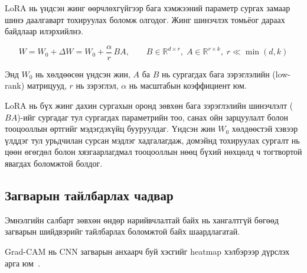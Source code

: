 LoRA нь үндсэн жинг өөрчлөхгүйгээр бага хэмжээний параметр сургах замаар шинэ даалгаварт тохируулах боломж олгодог. Жинг шинэчлэх томьёог дараах байдлаар илэрхийлнэ.

\begin{equation}
    W = W_0 + \Delta W = W_0 + \frac{\alpha}{r}\, B A,
    \qquad B \in \mathbb{R}^{d \times r},\; A \in \mathbb{R}^{r \times k},\; r \ll \min(d, k)
    \label{eq:lora}
\end{equation}

Энд $W_0$ нь хөлдөөсөн үндсэн жин, $A$ ба $B$ нь сургагдах бага зэрэглэлийн (low-rank) матрицууд, $r$ нь зэрэглэл, $\alpha$ нь масштабын коэффициент юм.

LoRA нь бүх жинг дахин сургахын оронд зөвхөн бага зэрэглэлийн шинэчлэлт ($BA$)-ийг сургадаг тул сургагдах параметрийн тоо, санах ойн зарцуулалт болон тооцооллын өртгийг мэдэгдэхүйц бууруулдаг. Үндсэн жин $W_0$ хөлдөөстэй хэвээр үлддэг тул урьдчилан сурсан мэдлэг хадгалагдаж, домэйнд тохируулах сургалт нь цөөн өгөгдөл болон хязгаарлагдмал тооцооллын нөөц бүхий нөхцөлд ч тогтвортой явагдах боломжтой болдог.

\subsection*{Загварын тайлбарлах чадвар}

\begin{figure}[H]
    \centering
    \label{fig:gradcam}
\end{figure}

\begin{figure}[H]
    \centering
    \label{fig:shap}
\end{figure}

Эмнэлгийн салбарт зөвхөн өндөр нарийвчлалтай байх нь хангалтгүй бөгөөд загварын шийдвэрийг тайлбарлах боломжтой байх шаардлагатай.

Grad-CAM нь CNN загварын анхаарч буй хэсгийг heatmap хэлбэрээр дүрслэх арга юм~\cite{ref37}.

